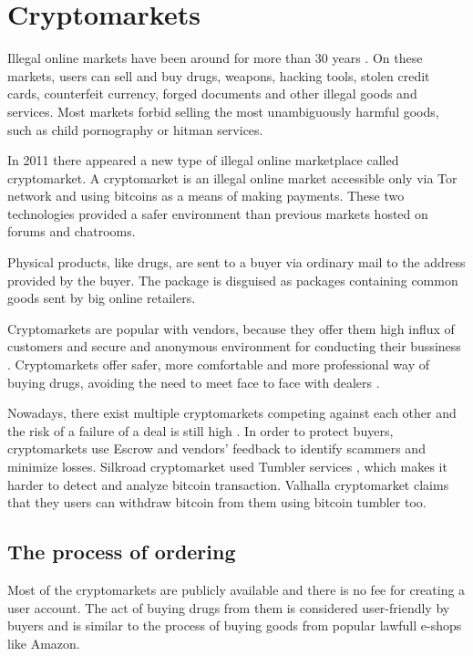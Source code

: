 \documentclass[
  digital, %
  table,   %
  lof,     %
  lot,     %
  oneside
]{fithesis3}
\begin{document}
\section{Cryptomarkets}

Illegal online markets have been around for more than 30 years \parencite{motoyama2011analysis}.
On these markets, users can sell and buy drugs, weapons, hacking tools, stolen credit cards,
counterfeit currency, forged documents and other illegal goods and services.
Most markets forbid selling the most unambiguously harmful goods, such as child pornography or hitman services.

In 2011 there appeared a new type of illegal online marketplace called cryptomarket. 
A cryptomarket is an illegal online market accessible only via Tor network and using bitcoins
as a means of making payments. These two technologies provided a safer environment
than previous markets hosted on forums and chatrooms.

Physical products, like drugs, are sent to a buyer via ordinary mail to the address provided by the buyer.
The package is disguised as packages containing common goods sent by big online retailers.
\parencite{paquet2017cryptomarkets}

Cryptomarkets are popular with vendors,
because they offer them high influx of customers and secure and anonymous environment for conducting their bussiness \parencite{van2014responsible}.
Cryptomarkets offer safer, more comfortable and more professional way of buying drugs, avoiding 
the need to meet face to face with dealers \parencite{barratt2014use}.

Nowadays, there exist multiple cryptomarkets competing against each other and the risk
of a failure of a deal is still high \parencite{wehinger2011dark}.
In order to protect buyers, cryptomarkets use Escrow and vendors' feedback to identify scammers and minimize losses.
Silkroad cryptomarket used Tumbler services \parencite{ron2014did},
which makes it harder to detect and analyze bitcoin transaction. Valhalla cryptomarket claims that they
users can withdraw bitcoin from them using bitcoin tumbler too.

\subsection{The process of ordering}
Most of the cryptomarkets are publicly available and there is no fee
for creating a user account. The act of buying drugs from them is considered user-friendly by buyers and is similar
to the process of buying goods from popular lawfull e-shops like Amazon.
\end{document}
